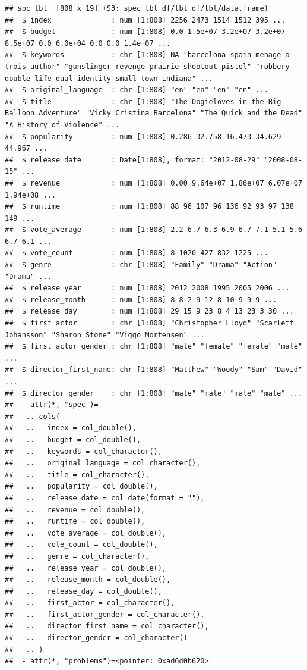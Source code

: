 \documentclass[
]{article}
\begin{document}
\begin{verbatim}
## spc_tbl_ [808 x 19] (S3: spec_tbl_df/tbl_df/tbl/data.frame)
##  $ index              : num [1:808] 2256 2473 1514 1512 395 ...
##  $ budget             : num [1:808] 0.0 1.5e+07 3.2e+07 3.2e+07 8.5e+07 0.0 6.0e+04 0.0 0.0 1.4e+07 ...
##  $ keywords           : chr [1:808] NA "barcelona spain menage a trois author" "gunslinger revenge prairie shootout pistol" "robbery double life dual identity small town indiana" ...
##  $ original_language  : chr [1:808] "en" "en" "en" "en" ...
##  $ title              : chr [1:808] "The Oogieloves in the Big Balloon Adventure" "Vicky Cristina Barcelona" "The Quick and the Dead" "A History of Violence" ...
##  $ popularity         : num [1:808] 0.286 32.758 16.473 34.629 44.967 ...
##  $ release_date       : Date[1:808], format: "2012-08-29" "2008-08-15" ...
##  $ revenue            : num [1:808] 0.00 9.64e+07 1.86e+07 6.07e+07 1.94e+08 ...
##  $ runtime            : num [1:808] 88 96 107 96 136 92 93 97 138 149 ...
##  $ vote_average       : num [1:808] 2.2 6.7 6.3 6.9 6.7 7.1 5.1 5.6 6.7 6.1 ...
##  $ vote_count         : num [1:808] 8 1020 427 832 1225 ...
##  $ genre              : chr [1:808] "Family" "Drama" "Action" "Drama" ...
##  $ release_year       : num [1:808] 2012 2008 1995 2005 2006 ...
##  $ release_month      : num [1:808] 8 8 2 9 12 8 10 9 9 9 ...
##  $ release_day        : num [1:808] 29 15 9 23 8 4 13 23 3 30 ...
##  $ first_actor        : chr [1:808] "Christopher Lloyd" "Scarlett Johansson" "Sharon Stone" "Viggo Mortensen" ...
##  $ first_actor_gender : chr [1:808] "male" "female" "female" "male" ...
##  $ director_first_name: chr [1:808] "Matthew" "Woody" "Sam" "David" ...
##  $ director_gender    : chr [1:808] "male" "male" "male" "male" ...
##  - attr(*, "spec")=
##   .. cols(
##   ..   index = col_double(),
##   ..   budget = col_double(),
##   ..   keywords = col_character(),
##   ..   original_language = col_character(),
##   ..   title = col_character(),
##   ..   popularity = col_double(),
##   ..   release_date = col_date(format = ""),
##   ..   revenue = col_double(),
##   ..   runtime = col_double(),
##   ..   vote_average = col_double(),
##   ..   vote_count = col_double(),
##   ..   genre = col_character(),
##   ..   release_year = col_double(),
##   ..   release_month = col_double(),
##   ..   release_day = col_double(),
##   ..   first_actor = col_character(),
##   ..   first_actor_gender = col_character(),
##   ..   director_first_name = col_character(),
##   ..   director_gender = col_character()
##   .. )
##  - attr(*, "problems")=<pointer: 0xad6d0b620>
\end{verbatim}
\end{document}
